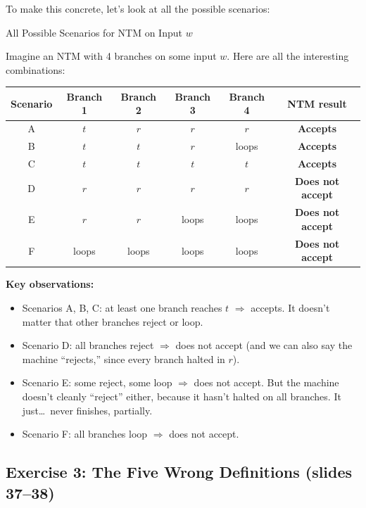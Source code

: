 To make this concrete, let's look at all the possible scenarios:

\begin{examplebox}{All Possible Scenarios for NTM on Input $w$}

Imagine an NTM with 4 branches on some input $w$. Here are all the interesting
combinations:

\begin{center}
\renewcommand{\arraystretch}{1.4}
\begin{tabular}{cccccc}
\toprule
\textbf{Scenario} & \textbf{Branch 1} & \textbf{Branch 2} & \textbf{Branch 3}
& \textbf{Branch 4} & \textbf{NTM result} \\
\midrule
A & $t$ & $r$ & $r$ & $r$ & \textbf{Accepts} \\
B & $t$ & $t$ & $r$ & loops & \textbf{Accepts} \\
C & $t$ & $t$ & $t$ & $t$ & \textbf{Accepts} \\
D & $r$ & $r$ & $r$ & $r$ & \textbf{Does not accept} \\
E & $r$ & $r$ & loops & loops & \textbf{Does not accept} \\
F & loops & loops & loops & loops & \textbf{Does not accept} \\
\bottomrule
\end{tabular}
\end{center}

\textbf{Key observations:}
\begin{itemize}[nosep]
\item Scenarios A, B, C: at least one branch reaches $t$ $\Rightarrow$ accepts.
  It doesn't matter that other branches reject or loop.
\item Scenario D: all branches reject $\Rightarrow$ does not accept (and we can
  also say the machine ``rejects,'' since every branch halted in $r$).
\item Scenario E: some reject, some loop $\Rightarrow$ does not accept. But
  the machine doesn't cleanly ``reject'' either, because it hasn't halted on
  all branches. It just\ldots\ never finishes, partially.
\item Scenario F: all branches loop $\Rightarrow$ does not accept.
\end{itemize}
\end{examplebox}

\subsection{Exercise 3: The Five Wrong Definitions (slides 37--38)}
\label{subsec:five-wrong-defs}

